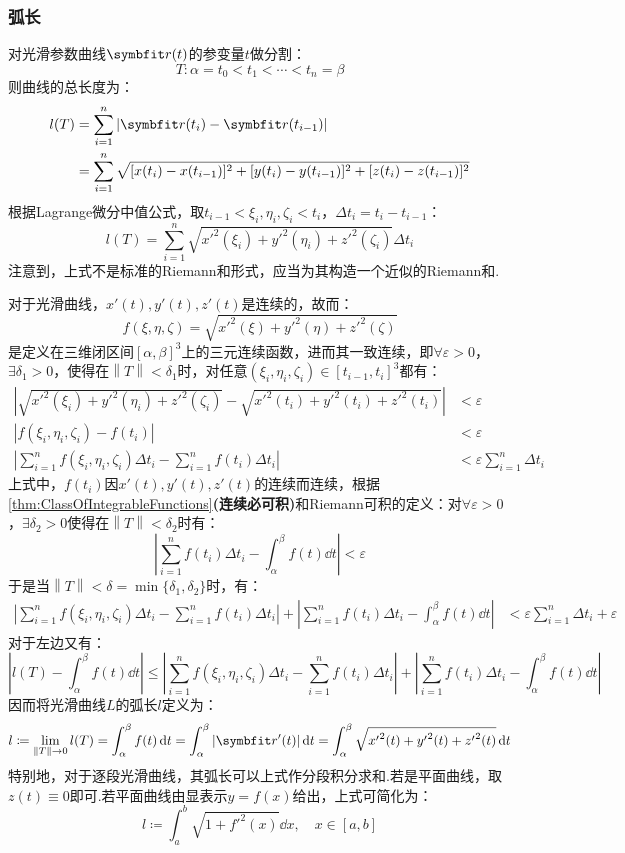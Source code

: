 \subsubsection{弧长}
对光滑参数曲线$\vb{r}(t)$的参变量$t$做分割：
\[T:\alpha = t_0 < t_1 < \cdots < t_n = \beta\]
则曲线的总长度为：
\begin{align*}
    l(T) &= \sum_{i=1}^{n}|\vb{r}(t_i) - \vb{r}(t_{i-1})| \\
    &= \sum_{i=1}^{n}\sqrt{[x(t_i)-x(t_{i-1})]^2 + [y(t_i)-y(t_{i-1})]^2 + [z(t_i)-z(t_{i-1})]^2}
\end{align*}
根据Lagrange微分中值公式，取$t_{i-1} < \xi_i,\eta_i,\zeta_i < t_i$，$\Delta t_i = t_i - t_{i-1}$：
\[l(T) = \sum_{i=1}^{n}\sqrt{{x'}^2(\xi_i) + {y'}^2(\eta_i) + {z'}^2(\zeta_i)}\Delta t_i\]
注意到，上式不是标准的Riemann和形式，应当为其构造一个近似的Riemann和.

对于光滑曲线，$x'(t),y'(t),z'(t)$是连续的，故而：
\[f(\xi,\eta,\zeta) = \sqrt{{x'}^2(\xi) + {y'}^2(\eta) + {z'}^2(\zeta)}\]
是定义在三维闭区间$[\alpha,\beta]^3$上的三元连续函数，进而其一致连续，即$\forall\varepsilon>0$，$\exists\delta_1>0$，使得在$\left\|T\right\|<\delta_1$时，对任意$(\xi_i,\eta_i,\zeta_i)\in[t_{i-1},t_i]^3$都有：
\begin{align*}
    \left|\sqrt{{x'}^2(\xi_i) + {y'}^2(\eta_i) + {z'}^2(\zeta_i)} - \sqrt{{x'}^2(t_i) + {y'}^2(t_i) + {z'}^2(t_i)}\right| &< \varepsilon \\
    \left|f(\xi_i,\eta_i,\zeta_i) - f(t_i)\right| &< \varepsilon \\
    \left|\sum_{i=1}^{n}f(\xi_i,\eta_i,\zeta_i)\Delta t_i - \sum_{i=1}^{n}f(t_i)\Delta t_i\right| &< \varepsilon\sum_{i=1}^{n}\Delta t_i
\end{align*}
上式中，$f(t_i)$因$x'(t),y'(t),z'(t)$的连续而连续，根据\cref{thm:ClassOfIntegrableFunctions}\textbf{(连续必可积)}和Riemann可积的定义：对$\forall\varepsilon>0$，$\exists\delta_2>0$使得在$\left\|T\right\|<\delta_2$时有：
\[\left|\sum_{i=1}^{n}f(t_i)\Delta t_i - \int_{\alpha}^{\beta}f(t)\dd{t}\right| < \varepsilon\]
于是当$\left\|T\right\|<\delta = \min\{\delta_1,\delta_2\}$时，有：
\begin{align*}
    \left|\sum_{i=1}^{n}f(\xi_i,\eta_i,\zeta_i)\Delta t_i - \sum_{i=1}^{n}f(t_i)\Delta t_i\right| + \left|\sum_{i=1}^{n}f(t_i)\Delta t_i - \int_{\alpha}^{\beta}f(t)\dd{t}\right| &< \varepsilon\sum_{i=1}^{n}\Delta t_i + \varepsilon
\end{align*}
对于左边又有：
\[\left|l(T) - \int_{\alpha}^{\beta}\!\!f(t)\dd{t}\right| \leqslant \left|\sum_{i=1}^{n}f(\xi_i,\eta_i,\zeta_i)\Delta t_i - \sum_{i=1}^{n}f(t_i)\Delta t_i\right| + \left|\sum_{i=1}^{n}f(t_i)\Delta t_i - \int_{\alpha}^{\beta}\!\!f(t)\dd{t}\right|\]
因而将光滑曲线$L$的弧长$l$定义为：
\[l \coloneq \lim_{\left\|T\right\|\to0}l(T) = \int_{\alpha}^{\beta}f(t)\dd{t} = \int_{\alpha}^{\beta}|\vb{r}'(t)|\dd{t} = \int_{\alpha}^{\beta}\sqrt{{x'}^2(t) + {y'}^2(t) + {z'}^2(t)}\dd{t}\]
特别地，对于逐段光滑曲线，其弧长可以上式作分段积分求和.若是平面曲线，取$z(t)\equiv0$即可.若平面曲线由显表示$y=f(x)$给出，上式可简化为：
\[l \coloneq \int_{a}^{b}\sqrt{1+{f'}^2(x)}\dd{x},\quad x\in[a,b]\]


